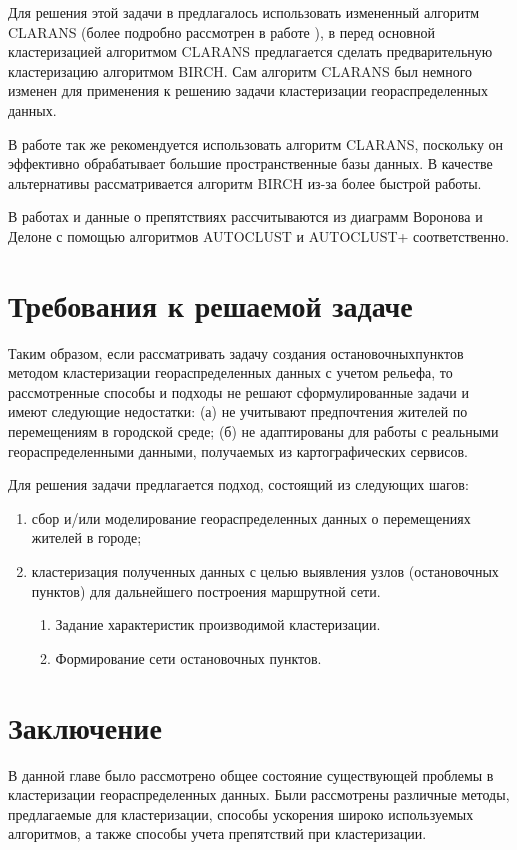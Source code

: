 Для решения этой задачи в \cite{presence} предлагалось использовать измененный алгоритм CLARANS (более подробно рассмотрен в работе \cite{cod}), в \cite{cod} перед основной кластеризацией алгоритмом CLARANS предлагается сделать предварительную кластеризацию алгоритмом BIRCH. Сам алгоритм CLARANS был немного изменен для применения к решению задачи кластеризации геораспределенных данных.

В работе \cite{koperski} так же рекомендуется использовать алгоритм CLARANS, поскольку он эффективно обрабатывает большие пространственные базы данных. В качестве альтернативы рассматривается алгоритм BIRCH из-за более быстрой работы.

В работах \cite{estivill} и \cite{obstacles} данные о препятствиях рассчитываются из диаграмм Воронова и Делоне с помощью алгоритмов AUTOCLUST и AUTO\-CLUST+ соответственно.

\section{Требования к решаемой задаче}
Таким образом, если рассматривать задачу создания остановочных\linebreak пунктов методом кластеризации геораспределенных данных с учетом рельефа, то рассмотренные способы и подходы не решают сформулированные задачи и имеют следующие недостатки: (а) не учитывают предпочтения жителей по перемещениям в городской среде; (б) не адаптированы для работы с реальными геораспределенными данными, получаемых из картографических сервисов.

Для решения задачи предлагается подход, состоящий из следующих шагов:
\begin{enumerate}
    \item сбор и/или моделирование геораспределенных данных о перемещениях жителей в городе;
    \item кластеризация полученных данных с целью выявления узлов (остановочных пунктов) для дальнейшего построения маршрутной сети.
    \begin{enumerate}
        \item Задание характеристик производимой кластеризации.
        \item Формирование сети остановочных пунктов.
    \end{enumerate}
\end{enumerate}

\section{Заключение}
В данной главе было рассмотрено общее состояние существующей проблемы в кластеризации геораспределенных данных. Были рассмотрены различные методы, предлагаемые для кластеризации, способы ускорения широко используемых алгоритмов, а также способы учета препятствий при кластеризации.
